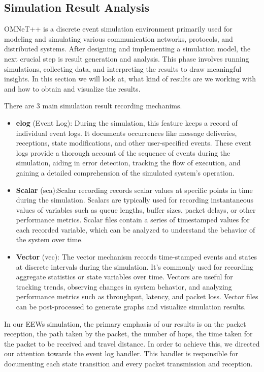 \newpage
\subsection{Simulation Result Analysis}

OMNeT++ is a discrete event simulation environment primarily used for modeling and simulating various communication networks, protocols, and distributed systems. After designing and implementing a simulation model, the next crucial step is result generation and analysis. This phase involves running simulations, collecting data, and interpreting the results to draw meaningful insights. In this section we will look at, what kind of results are we working with and how to obtain and visualize the results.

There are 3 main simulation result recording mechanims.
\begin{itemize}
    \item \textbf{elog} (Event Log): During the simulation, this feature keeps a record of individual event logs. It documents occurrences like message deliveries, receptions, state modifications, and other user-specified events. These event logs provide a thorough account of the sequence of events during the simulation, aiding in error detection, tracking the flow of execution, and gaining a detailed comprehension of the simulated system's operation.
    
    \item \textbf{Scalar} (sca):Scalar recording records scalar values at specific points in time during the simulation. Scalars are typically used for recording instantaneous values of variables such as queue lengths, buffer sizes, packet delays, or other performance metrics. Scalar files contain a series of timestamped values for each recorded variable, which can be analyzed to understand the behavior of the system over time.
    \item \textbf{Vector} (vec): The vector mechanism records time-stamped events and states at discrete intervals during the simulation. It's commonly used for recording aggregate statistics or state variables over time. Vectors are useful for tracking trends, observing changes in system behavior, and analyzing performance metrics such as throughput, latency, and packet loss. Vector files can be post-processed to generate graphs and visualize simulation results.
\end{itemize}


In our \ac{EEWs} simulation, the primary emphasis of our results is on the packet reception, the path taken by the packet, the number of hops, the time taken for the packet to be received and travel distance. In order to achieve this, we directed our attention towards the event log handler. This handler is responsible for documenting each state transition and every packet transmission and reception.

